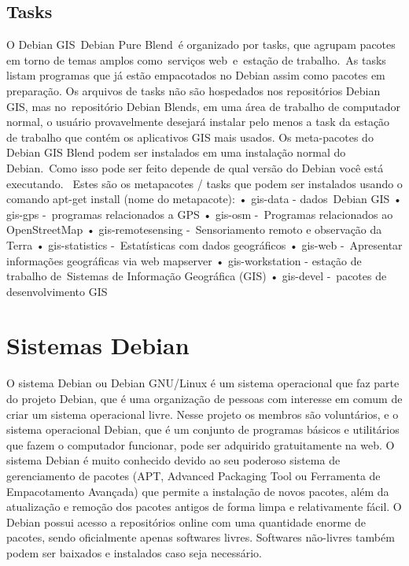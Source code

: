 \subsection{Tasks}

O Debian GIS Debian Pure Blend é organizado por tasks, que agrupam pacotes em torno de temas amplos como serviços web e estação de trabalho. As tasks listam programas que já estão empacotados no Debian assim como pacotes em preparação. Os arquivos de tasks não são hospedados nos repositórios Debian GIS, mas no repositório Debian Blends, em uma área de trabalho de computador normal, o usuário provavelmente desejará instalar pelo menos a task da estação de trabalho que contém os aplicativos GIS mais usados. 
Os meta-pacotes do Debian GIS Blend podem ser instalados em uma instalação normal do Debian. Como isso pode ser feito depende de qual versão do Debian você está executando.  
Estes são os metapacotes / tasks que podem ser instalados usando o comando apt-get install (nome do metapacote):
• gis-data - dados Debian GIS
• gis-gps - programas relacionados a GPS
• gis-osm - Programas relacionados ao OpenStreetMap
• gis-remotesensing - Sensoriamento remoto e observação da Terra
• gis-statistics - Estatísticas com dados geográficos
• gis-web - Apresentar informações geográficas via web mapserver
• gis-workstation - estação de trabalho de Sistemas de Informação Geográfica (GIS)
• gis-devel - pacotes de desenvolvimento GIS

\section{Sistemas Debian}

O sistema Debian ou Debian GNU/Linux é um sistema operacional que faz parte do projeto Debian, que é uma organização de pessoas com interesse em comum de criar um sistema operacional livre. Nesse projeto os membros são voluntários, e o sistema operacional Debian, que é um conjunto de programas básicos e utilitários que fazem o computador funcionar, pode ser adquirido gratuitamente na web. O sistema Debian é muito conhecido devido ao seu poderoso sistema de gerenciamento de pacotes (APT, Advanced Packaging Tool ou Ferramenta de Empacotamento Avançada) que permite a instalação de novos pacotes, além da atualização e remoção dos pacotes antigos de forma limpa e relativamente fácil. O Debian possui acesso a repositórios online com uma quantidade enorme de pacotes, sendo oficialmente apenas softwares livres. Softwares não-livres também podem ser baixados e instalados caso seja necessário.


